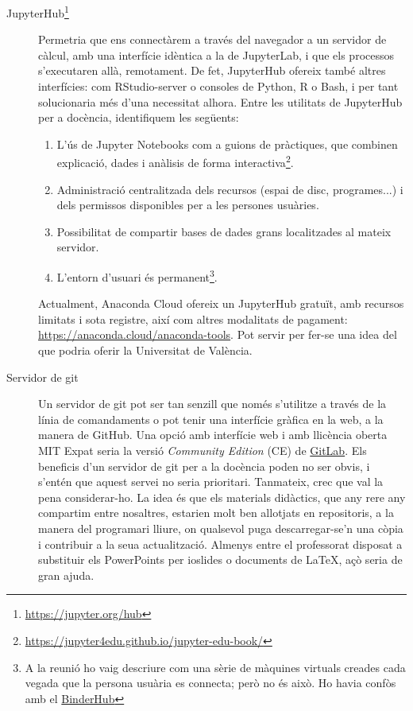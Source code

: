 \documentclass[a4paper,12pt]{article}
\begin{document}
\begin{description}
   \item[JupyterHub\footnote{\href{https://jupyter.org/hub}{https://jupyter.org/hub}}] Permetria
que ens connectàrem a través del navegador
a un servidor de càlcul, amb una interfície idèntica a la de JupyterLab, i que els
processos s'executaren allà, remotament. De fet, JupyterHub ofereix també altres interfícies:
com RStudio-server o consoles de Python, R o Bash, i per tant solucionaria més d'una
necessitat alhora. Entre les utilitats de JupyterHub per a docència, identifiquem les
següents:
   \begin{enumerate}
   \item L'ús de Jupyter Notebooks com a guions de pràctiques, que combinen explicació,
         dades i anàlisis de forma interactiva\footnote{\href{https://jupyter4edu.github.io/jupyter-edu-book/}{https://jupyter4edu.github.io/jupyter-edu-book/}}.
   \item Administració centralitzada dels recursos (espai de disc, programes...) i dels permissos
         disponibles per a les persones usuàries.
   \item Possibilitat de compartir bases de dades grans localitzades al mateix servidor.
   \item L'entorn d'usuari és permanent\footnote{A la reunió ho vaig descriure com una sèrie de màquines virtuals creades cada vegada que la persona usuària es connecta; però no és això. Ho havia confòs amb el \href{https://jupyter.org/binder}{BinderHub}}.
   \end{enumerate}

Actualment, Anaconda Cloud ofereix un JupyterHub gratuït, amb recursos limitats i sota
registre, així com altres modalitats de pagament: \href{https://anaconda.cloud/anaconda-tools}{https://anaconda.cloud/anaconda-tools}.
Pot servir per fer-se una idea del que podria oferir la Universitat de València.

   \item[Servidor de git] Un servidor de \textsf{git} pot ser tan senzill que només
s'utilitze a través de la línia de comandaments o pot tenir una interfície gràfica en la web,
a la manera de GitHub. Una opció amb interfície web i amb llicència oberta MIT Expat seria
la versió \emph{Community Edition} (CE) de \href{https://gitlab.com/gitlab-org/gitlab-foss/-/blob/master/README.md}{GitLab}. Els beneficis d'un servidor de git per a la docència poden no
ser obvis, i s'entén que aquest servei no seria prioritari. Tanmateix, crec que val la pena
considerar-ho. La idea és que els materials didàctics, que any rere any compartim entre
nosaltres, estarien molt ben allotjats en repositoris, a la manera del programari lliure,
on qualsevol puga descarregar-se'n una còpia i contribuir a la seua actualització. Almenys
entre el professorat disposat a substituir els PowerPoints per ioslides o documents de \LaTeX,
açò seria de gran ajuda.


\end{description}
\end{document}
